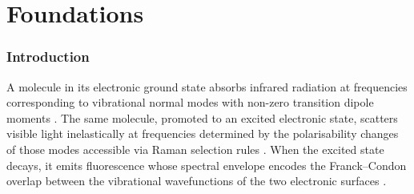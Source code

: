 \documentclass[11pt,twocolumn,a4paper]{article}
\theoremstyle{definition}
\theoremstyle{remark}
\begin{document}
\begin{abstract}
Validation on CH$_4^+$ ($T_d$ symmetry, 4 fundamental modes) achieves 99.5\% cross-prediction accuracy between Raman and IR, mutual exclusion violation $V_{\mathrm{ME}} = 0.000$, and ternary trajectory fidelity $F = 0.983$. Validation on Rhodamine~6G reproduces Stokes shift ($1011~\mathrm{cm}^{-1}$ predicted vs $1015 \pm 10$ measured), reorganisation energy ($506~\mathrm{cm}^{-1}$ vs $510 \pm 20$), Huang--Rhys factor $S_{\mathrm{CO}} = 0.4$ vs $0.38 \pm 0.05$, and confirms $C_2$ point group symmetry from diffraction.

\medskip
\noindent\textbf{Keywords:} spectral holography, emission-strobed spectroscopy, three-state superposition, S-entropy coordinates, ternary state tomography, Franck--Condon extraction, Stokes shift decomposition, Huang--Rhys factors, molecular diffraction, autocatalytic measurement, GPU categorical instrument, empty dictionary principle
\end{abstract}




\part{Foundations}

\section{Introduction}
\label{sec:introduction}

A molecule in its electronic ground state absorbs infrared radiation at frequencies corresponding to vibrational normal modes with non-zero transition dipole moments \citep{herzberg1945}. The same molecule, promoted to an excited electronic state, scatters visible light inelastically at frequencies determined by the polarisability changes of those modes accessible via Raman selection rules \citep{raman1928, long2002}. When the excited state decays, it emits fluorescence whose spectral envelope encodes the Franck--Condon overlap between the vibrational wavefunctions of the two electronic surfaces \citep{franck1926, condon1928}.
\end{document}
